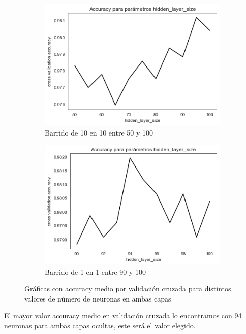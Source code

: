 \documentclass[11pt,a4paper]{article}
\theoremstyle{definition}
\begin{document}
	\begin{figure}[H]
		\centering
		\begin{subfigure}{.5\textwidth}
  		\centering
 		\includegraphics[width=1\textwidth]{images/hidden_layer_est1}
 		\caption{Barrido de 10 en 10 entre 50 y 100}
  		\label{fig:sub1}
		\end{subfigure}%
		\begin{subfigure}{.5\textwidth}
  		\centering
  		\includegraphics[width=1\textwidth]{images/hidden_layer_est2}
  		\caption{Barrido de 1 en 1 entre 90 y 100}
  		\label{fig:sub2}
		\end{subfigure}
		\caption{Gráficas con accuracy medio por validación cruzada para distintos valores de número de neuronas en ambas capas}
		\label{fig:test}
	\end{figure}
	El mayor valor accuracy medio en validación cruzada lo encontramos con 94 neuronas para ambas capas ocultas, este será el valor elegido.
	
\end{document}
